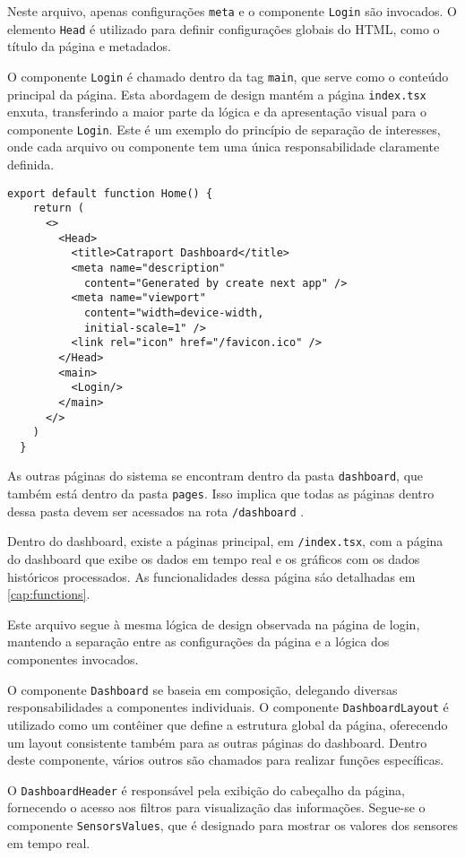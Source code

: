 Neste arquivo, apenas configurações \texttt{meta} e o componente \texttt{Login} são invocados. O elemento \texttt{Head} \cite{nextjsHeadComponent} é utilizado para definir configurações globais do HTML, como o título da página e metadados. 

O componente \texttt{Login} é chamado dentro da tag \texttt{main}, que serve como o conteúdo principal da página. Esta abordagem de design mantém a página \texttt{index.tsx} enxuta, transferindo a maior parte da lógica e da apresentação visual para o componente \texttt{Login}. Este é um exemplo do princípio de separação de interesses, onde cada arquivo ou componente tem uma única responsabilidade claramente definida.

\begin{verbatim}
export default function Home() {
    return (
      <>
        <Head>
          <title>Catraport Dashboard</title>
          <meta name="description" 
            content="Generated by create next app" />
          <meta name="viewport" 
            content="width=device-width,
            initial-scale=1" />
          <link rel="icon" href="/favicon.ico" />
        </Head>
        <main>
          <Login/>
        </main>
      </>
    )
  }
\end{verbatim}

As outras páginas do sistema se encontram dentro da pasta \texttt{dashboard}, que também está dentro da pasta \texttt{pages}. Isso implica que todas as páginas dentro dessa pasta devem ser acessados na rota \texttt{/dashboard} \cite{nextjsDefiningRoutes}.

Dentro do dashboard, existe a páginas principal, em \texttt{/index.tsx}, com a página do dashboard que exibe os dados em tempo real e os gráficos com os dados históricos processados. As funcionalidades dessa página sáo detalhadas em \ref{cap:functions}.

Este arquivo segue à mesma lógica de design observada na página de login, mantendo a separação entre as configurações da página e a lógica dos componentes invocados.

O componente \texttt{Dashboard} se baseia em composição, delegando diversas responsabilidades a componentes individuais. O componente \texttt{DashboardLayout} é utilizado como um contêiner que define a estrutura global da página, oferecendo um layout consistente também para as outras páginas do dashboard. Dentro deste componente, vários outros são chamados para realizar funções específicas.

O \texttt{DashboardHeader} é responsável pela exibição do cabeçalho da página, fornecendo o acesso aos filtros para visualização das informações. Segue-se o componente \texttt{SensorsValues}, que é designado para mostrar os valores dos sensores em tempo real.

